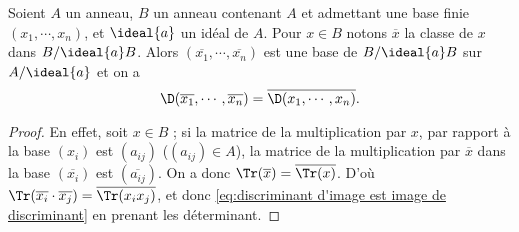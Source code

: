 \documentclass[11pt, useosf,
  title in boldface,
  theorem in new line,
  theorem numbering = section,
  number theorems separately,
]{simplivre}
\begin{document}
    \begin{lemma}\label{lem:discriminant d'image est image de discriminant}
        Soient \( A \) un anneau, \( B \) un anneau contenant \( A \) et admettant une base finie \( (x_1, \cdots, x_n) \), et \( \ideal{a} \) un idéal de \( A \). Pour \( x \in B \) notons \( \overline{x} \) la classe de \( x \) dans \( B/\ideal{a}B \). Alors \( (\overline{x_1}, \cdots, \overline{x_n}) \) est une base de \( B/\ideal{a}B \) sur \( A/\ideal{a} \) et on a
        \begin{equation}\label{eq:discriminant d'image est image de discriminant}
            \D(\overline{x_1}, \cdots, \overline{x_n}) = \overline{\D(x_1, \cdots, x_n)}.
        \end{equation}
    \end{lemma}
    \begin{proof}
        En effet, soit \( x \in B \) ; si la matrice de la multiplication par \( x \), par rapport à la base \( (x_i) \) est \( (a_{ij}) \) (\( (a_{ij}) \in A \)), la matrice de la multiplication par \( \overline{x} \) dans la base \( (\overline{x_i}) \) est \( (\overline{a_{ij}}) \). On a donc \( \Tr(\overline{x}) = \overline{\Tr(x)} \). D'où \( \Tr(\overline{x_i} \cdot \overline{x_j}) = \overline{\Tr(x_i x_j)} \), et donc \eqref{eq:discriminant d'image est image de discriminant} en prenant les déterminant.
    \end{proof}
\end{document}
